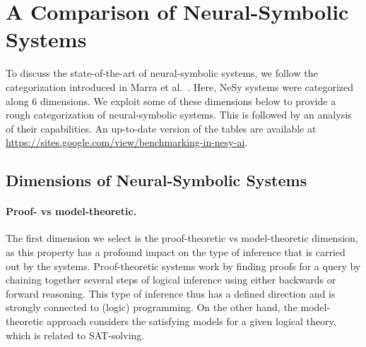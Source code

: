 \section{A Comparison of Neural-Symbolic Systems}\label{tailor:sec:systems}
To discuss the state-of-the-art of neural-symbolic systems, we follow the categorization introduced in Marra et al.~\cite{marra2024statistical}. Here, NeSy systems were categorized along 6 dimensions. We exploit some of these dimensions below to provide a rough categorization of neural-symbolic systems. This is followed by an analysis of their capabilities. %
An up-to-date version of the tables are available at \url{https://sites.google.com/view/benchmarking-in-nesy-ai}.



\subsection{Dimensions of Neural-Symbolic Systems}
\paragraph{Proof- vs model-theoretic. }
The first dimension we select is the proof-theoretic vs model-theoretic dimension, as this property has a profound impact on the type of inference that is carried out by the systems. Proof-theoretic systems work by finding proofs for a query by chaining together several steps of logical inference using either backwards or forward reasoning. This type of inference thus has a defined direction and is strongly connected to (logic) programming.
On the other hand, the model-theoretic approach considers the satisfying models for a given logical theory, which is related to SAT-solving.
